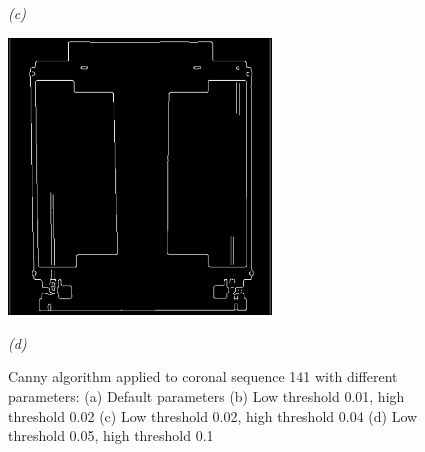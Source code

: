 \begin{figure}[htb]
\begin{minipage}[b]{2.75in}
    \centerline{\emph{(c)}}
  \end{minipage}\medskip
  \begin{minipage}[b]{2.75in}
    \centering
    \centerline{\mbox{\includegraphics[width=2.75in]{data_extraction/images/canny/0.05_0.1/20121017_141.eps}}}
    \centerline{\emph{(d)}}
  \end{minipage}
  \caption{Canny algorithm applied to coronal sequence 141 with different parameters: (a) Default parameters (b) Low threshold 0.01, high threshold 0.02 (c) Low threshold 0.02, high threshold 0.04 (d) Low threshold 0.05, high threshold  0.1} 
  \label{fig:canny_ct_141}
\end{figure}

